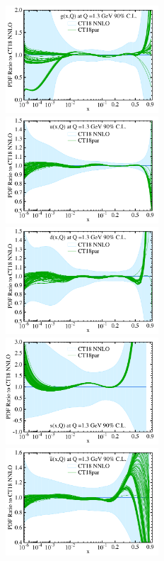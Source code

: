 \begin{figure}[tb]
        \center
	\hspace*{-0.5cm}\includegraphics[width=0.51\textwidth]{fig/params/g_par_CT18_ect.pdf}
        \includegraphics[width=0.51\textwidth]{fig/params/u_par_CT18_ect.pdf}\\
        \hspace*{-0.5cm}\includegraphics[width=0.51\textwidth]{fig/params/d_par_CT18_ect.pdf}
        \includegraphics[width=0.51\textwidth]{fig/params/s_par_CT18_ect.pdf}\\
        \hspace*{-0.5cm}\includegraphics[width=0.51\textwidth]{fig/params/ubar_par_CT18_ect.pdf} 

\end{figure}
